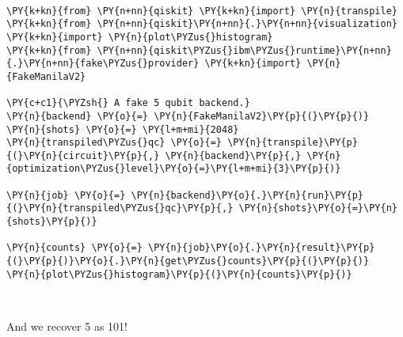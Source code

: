             
    
    \begin{center}
    \end{center}
    { \hspace*{\fill} \\}
    

    \begin{tcolorbox}[breakable, size=fbox, boxrule=1pt, pad at break*=1mm,colback=cellbackground, colframe=cellborder]
\begin{Verbatim}[commandchars=\\\{\}]
\PY{k+kn}{from} \PY{n+nn}{qiskit} \PY{k+kn}{import} \PY{n}{transpile}
\PY{k+kn}{from} \PY{n+nn}{qiskit}\PY{n+nn}{.}\PY{n+nn}{visualization} \PY{k+kn}{import} \PY{n}{plot\PYZus{}histogram}
\PY{k+kn}{from} \PY{n+nn}{qiskit\PYZus{}ibm\PYZus{}runtime}\PY{n+nn}{.}\PY{n+nn}{fake\PYZus{}provider} \PY{k+kn}{import} \PY{n}{FakeManilaV2}

\PY{c+c1}{\PYZsh{} A fake 5 qubit backend.}
\PY{n}{backend} \PY{o}{=} \PY{n}{FakeManilaV2}\PY{p}{(}\PY{p}{)}
\PY{n}{shots} \PY{o}{=} \PY{l+m+mi}{2048}
\PY{n}{transpiled\PYZus{}qc} \PY{o}{=} \PY{n}{transpile}\PY{p}{(}\PY{n}{circuit}\PY{p}{,} \PY{n}{backend}\PY{p}{,} \PY{n}{optimization\PYZus{}level}\PY{o}{=}\PY{l+m+mi}{3}\PY{p}{)}

\PY{n}{job} \PY{o}{=} \PY{n}{backend}\PY{o}{.}\PY{n}{run}\PY{p}{(}\PY{n}{transpiled\PYZus{}qc}\PY{p}{,} \PY{n}{shots}\PY{o}{=}\PY{n}{shots}\PY{p}{)}

\PY{n}{counts} \PY{o}{=} \PY{n}{job}\PY{o}{.}\PY{n}{result}\PY{p}{(}\PY{p}{)}\PY{o}{.}\PY{n}{get\PYZus{}counts}\PY{p}{(}\PY{p}{)}
\PY{n}{plot\PYZus{}histogram}\PY{p}{(}\PY{n}{counts}\PY{p}{)}
\end{Verbatim}
\end{tcolorbox}
 
            
    
    \begin{center}
    \end{center}
    { \hspace*{\fill} \\}
    

    And we recover 5 as 101!
